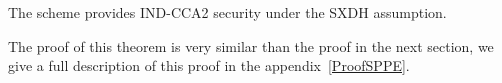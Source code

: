 \begin{myTh}
  The scheme provides IND-CCA2 security under the SXDH assumption.
\end{myTh}


The proof of this theorem is very similar than the proof in the next section, we give a full description of this proof in the appendix~\ref{ProofSPPE}.
